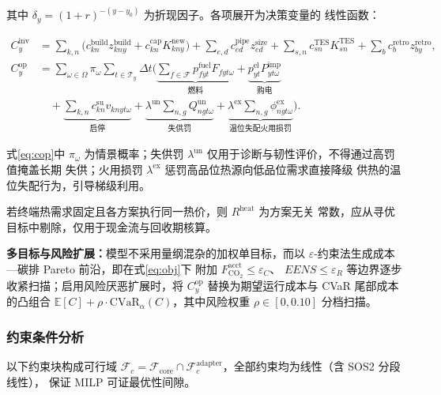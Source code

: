 其中 $\delta_y=(1+r)^{-(y-y_0)}$ 为折现因子。各项展开为决策变量的
线性函数：

{\small
\begin{align}
C_y^{\mathrm{inv}} &=\sum_{k,n}\Big(
c_{kn}^{\mathrm{build}}z^{\mathrm{build}}_{kny}
+c_{kn}^{\mathrm{cap}}K^{\mathrm{new}}_{kny}\Big)
+\sum_{e,d}c_{ed}^{\mathrm{pipe}}z^{\mathrm{size}}_{ed}
+\sum_{s,n}c_{sn}^{\mathrm{TES}}K^{\mathrm{TES}}_{sn}
+\sum_{b}c_{b}^{\mathrm{retro}}z^{\mathrm{retro}}_{by},
\label{eq:cinv}\\[2pt]
C_y^{\mathrm{op}} &=\sum_{\omega\in\Omega}\pi_\omega\sum_{t\in\mathcal T_y}\Delta t\Big(
\underbrace{\sum_{f\in\mathcal F}p^{\mathrm{fuel}}_{fyt}F_{fyt\omega}}_{\text{燃料}}
+\underbrace{p^{\mathrm{el}}_{yt}P^{\mathrm{imp}}_{yt\omega}}_{\text{购电}}\\
&\quad +\underbrace{\sum_{k,n}c^{\mathrm{su}}_{kn}v_{knyt\omega}}_{\text{启停}}
+\underbrace{\lambda^{\mathrm{un}}\sum_{n,g}Q^{\mathrm{un}}_{ngt\omega}}_{\text{失供罚}}
+\underbrace{\lambda^{\mathrm{ex}}\sum_{n,g}\phi^{\mathrm{ex}}_{ngt\omega}}_{\text{温位失配火用损罚}}
\Big).
\label{eq:cop}
\end{align}
}

式\eqref{eq:cop}中 $\pi_\omega$ 为情景概率；失供罚
$\lambda^{\mathrm{un}}$ 仅用于诊断与韧性评价，不得通过高罚值掩盖长期
失供；火用损罚 $\lambda^{\mathrm{ex}}$ 惩罚高品位热源向低品位需求直接降级
供热的温位失配行为，引导梯级利用。

若终端热需求固定且各方案执行同一热价，则 $R^{\mathrm{heat}}$ 为方案无关
常数，应从寻优目标中剔除，仅用于现金流与回收期核算。

\textbf{多目标与风险扩展：}模型不采用量纲混杂的加权单目标，而以
$\varepsilon$-约束法生成成本—碳排 Pareto 前沿，即在式\eqref{eq:obj}下
附加 $F^{\mathrm{acct}}_{\mathrm{CO_2}}\le\varepsilon_C$、
$EENS\le\varepsilon_R$ 等边界逐步收紧扫描；启用风险厌恶扩展时，将
$C_y^{\mathrm{op}}$ 替换为期望运行成本与 CVaR 尾部成本的凸组合
$\mathbb E[C]+\rho\cdot\mathrm{CVaR}_{\alpha}(C)$，其中风险权重
$\rho\in[0,0.10]$ 分档扫描。

\subsubsection{约束条件分析}

以下约束块构成可行域 $\mathcal F_c=\mathcal F_{\mathrm{core}}\cap
\mathcal F_c^{\mathrm{adapter}}$，全部约束均为线性（含 SOS2 分段线性），
保证 MILP 可证最优性间隙。

